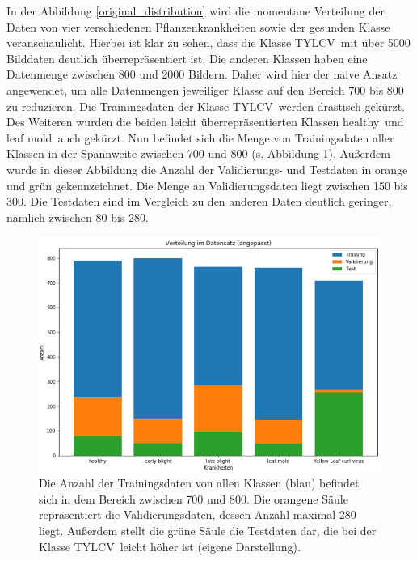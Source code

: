 In der Abbildung \ref{original_distribution} wird die momentane Verteilung der Daten von vier verschiedenen Pflanzenkrankheiten sowie der gesunden Klasse veranschaulicht. Hierbei ist klar zu sehen, dass die Klasse \glqq TYLCV\grqq~mit über 5000 Bilddaten deutlich überrepräsentiert ist. Die anderen Klassen haben eine Datenmenge zwischen 800 und 2000 Bildern. Daher wird hier der naive Ansatz angewendet, um alle Datenmengen jeweiliger Klasse auf den Bereich 700 bis 800 zu reduzieren. Die Trainingsdaten der Klasse \glqq TYLCV\grqq~werden drastisch gekürzt. Des Weiteren wurden die beiden leicht überrepräsentierten Klassen \glqq healthy\grqq~und \glqq leaf mold\grqq~auch gekürzt. Nun befindet sich die Menge von Trainingsdaten aller Klassen in der Spannweite zwischen 700 und 800 (s. Abbildung \ref{corrected_distribution}). Außerdem wurde in dieser Abbildung die Anzahl der Validierungs- und Testdaten in orange und grün gekennzeichnet. Die Menge an Validierungsdaten liegt zwischen 150 bis 300. Die Testdaten sind im Vergleich zu den anderen Daten deutlich geringer, nämlich zwischen 80 bis 280.

\begin{figure}[h!]
	\centering
	\includegraphics[width=\textwidth]{bilder/corrected_distribution.PNG}
	\caption{Die Anzahl der Trainingsdaten von allen Klassen (blau) befindet sich in dem Bereich zwischen 700 und 800. Die orangene Säule repräsentiert die Validierungsdaten, dessen Anzahl maximal 280 liegt. Außerdem stellt die grüne Säule die Testdaten dar, die bei der Klasse \glqq TYLCV\grqq~leicht höher ist (eigene Darstellung).}
	\label{corrected_distribution}
\end{figure}


